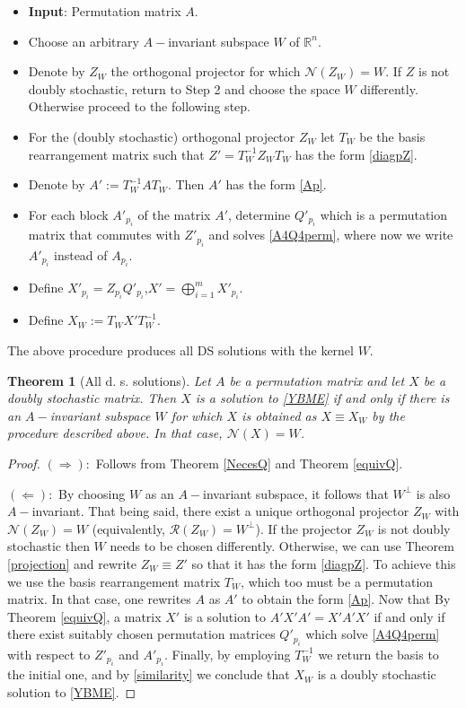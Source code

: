 \documentclass{article}
\newtheorem{theorem}{Theorem}[section]
\theoremstyle{definition}\newtheorem{example}{Example}[section]
\def\N{{\mathcal{N}}}
\def\R{{\mathcal{R}}}
\def\RR{\mathbb{R}}
\begin{document}
		\begin{itemize}
			\item[(Step 1.)] \textbf{Input}: Permutation matrix $A$.
			\item[(Step 2.)] Choose an arbitrary $A-$invariant subspace $W$ of $\RR^n$.
			\item[(Step 3.)] Denote by $Z_W$ the orthogonal projector for which $\N(Z_W)=W$. If $Z$ is not doubly stochastic, return to Step 2 and choose the space $W$ differently. Otherwise proceed to the following step.
			\item[(Step 4.)] For the (doubly stochastic) orthogonal projector $Z_W$ let $T_W$ be the basis rearrangement matrix such that $Z'=T_W^{-1}Z_WT_W$ has the form \eqref{diagpZ}.
			\item[(Step 5.)] Denote by $A':=T^{-1}_WAT_W$. Then $A'$ has the form \eqref{Ap}.
			\item[(Step 6.)] For each block $A'_{p_i}$ of the matrix $A'$, determine $Q'_{p_i}$ which is a permutation matrix that commutes with $Z'_{p_i}$ and solves \eqref{A4Q4perm}, where now we write $A'_{p_i}$ instead of $A_{p_i}$. 
			\item[(Step 7.)] Define $X'_{p_i}=Z_{p_i}Q'_{p_i}$,\quad  $X'=\bigoplus\limits_{i=1}^m X'_{p_i}$.
			\item[(Step 8.)] Define $X_W:=T_W X' T^{-1}_W$. 
		\end{itemize}
		The above procedure produces all DS solutions with the kernel $W$.   

	\begin{theorem}[All d. s. solutions]
		Let $A$ be a permutation matrix and let $X$ be a doubly stochastic matrix. Then $X$ is a solution to \eqref{YBME} if and only if there is an $A-$invariant subspace $W$ for which $X$ is obtained as $X\equiv X_W$ by the procedure described above. In that case, $\N(X)=W$.
	\end{theorem}
	\begin{proof} $(\Rightarrow):$ Follows from Theorem \ref{NecesQ} and Theorem \ref{equivQ}.
		
	$(\Leftarrow):$ By choosing $W$ as an $A-$invariant subspace, it follows that $W^\perp$ is also $A-$invariant. That being said, there exist a unique orthogonal projector $Z_W$ with $\N(Z_W)=W$ (equivalently, $\R(Z_W)=W^\perp$). If the projector $Z_W$ is not doubly stochastic then $W$ needs to be chosen differently. Otherwise, we can use Theorem \ref{projection} and rewrite $Z_W\equiv Z'$ so that it has the form \eqref{diagpZ}. To achieve this we use the basis rearrangement matrix $T_W$, which too must be a permutation matrix. In that case, one rewrites $A$ as $A'$ to obtain the form \eqref{Ap}. Now that By Theorem \ref{equivQ}, a matrix $X'$ is a solution to $A'X'A'=X'A'X'$ if and only if there exist suitably chosen permutation matrices $Q'_{p_i}$ which solve \eqref{A4Q4perm} with respect to $Z'_{p_i}$ and $A'_{p_i}$. Finally, by employing $T^{-1}_W$ we return the basis to the initial one, and by \eqref{similarity} we conclude that $X_W$ is a doubly stochastic solution to \eqref{YBME}.
		
	\end{proof}	
	
\end{document}
